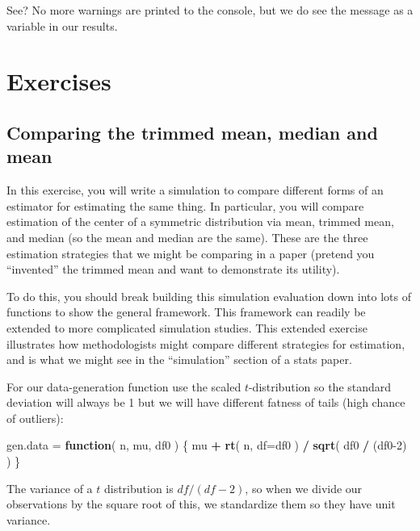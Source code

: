 \documentclass[
]{book}
\newenvironment{Shaded}{\begin{snugshade}}{\end{snugshade}}
\newcommand{\AttributeTok}[1]{\textcolor[rgb]{0.13,0.29,0.53}{#1}}
\newcommand{\ControlFlowTok}[1]{\textcolor[rgb]{0.13,0.29,0.53}{\textbf{#1}}}
\newcommand{\DecValTok}[1]{\textcolor[rgb]{0.00,0.00,0.81}{#1}}
\newcommand{\FunctionTok}[1]{\textcolor[rgb]{0.13,0.29,0.53}{\textbf{#1}}}
\newcommand{\NormalTok}[1]{#1}
\newcommand{\OtherTok}[1]{\textcolor[rgb]{0.56,0.35,0.01}{#1}}
\newcommand{\SpecialCharTok}[1]{\textcolor[rgb]{0.81,0.36,0.00}{\textbf{#1}}}
\begin{document}
See? No more warnings are printed to the console, but we do see the message as a variable in our results.

\section{Exercises}\label{exercises-8}

\subsection{Comparing the trimmed mean, median and mean}\label{exercise:trimmed-mean}

In this exercise, you will write a simulation to compare different forms of an
estimator for estimating the same thing.
In particular, you will compare estimation of the
center of a symmetric distribution via mean, trimmed mean, and median (so the
mean and median are the same). These are the three estimation strategies
that we might be comparing in a paper (pretend you ``invented'' the trimmed
mean and want to demonstrate its utility).

To do this, you should break building this simulation evaluation down into lots of
functions to show the general framework. This framework can readily be
extended to more complicated simulation studies.
This extended exercise illustrates how methodologists might compare different strategies for estimation, and is what we might see in the ``simulation'' section of a stats paper.

For our data-generation function use the scaled \(t\)-distribution so the standard deviation will always be 1 but we will have different fatness of tails (high chance of outliers):

\begin{Shaded}
\begin{Highlighting}[]
\NormalTok{gen.data }\OtherTok{=} \ControlFlowTok{function}\NormalTok{( n, mu, df0 ) \{}
\NormalTok{    mu }\SpecialCharTok{+} \FunctionTok{rt}\NormalTok{( n, }\AttributeTok{df=}\NormalTok{df0 ) }\SpecialCharTok{/} \FunctionTok{sqrt}\NormalTok{( df0 }\SpecialCharTok{/}\NormalTok{ (df0}\DecValTok{{-}2}\NormalTok{) )}
\NormalTok{\}}
\end{Highlighting}
\end{Shaded}

The variance of a \(t\) distribution is \(df/(df-2)\), so when we divide our observations by the
square root of this, we standardize them so they have unit variance.
\end{document}
